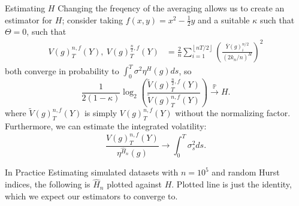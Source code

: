\documentclass[final,hyperref={pdfpagelabels=false}]{beamer}
\begin{document}
\begin{frame}{}
\begin{columns}[t]
      \begin{column}{0.28\linewidth}
        \begin{block}{Estimating \(H\)}
          Changing the freqency of the averaging allows us to create an estimator for \(H\); consider taking \(f(x, y) = x^2 - \frac{1}{2}y\) and a suitable \(\kappa\) such that \(\Theta = 0\), such that 
          \begin{align*}
            V(g)^{n,f}_T(Y), \ V(g)^{\frac{n}{2},f}_T(Y) &= \frac{2}{n}\sum_{i=1}^{\left\lfloor nT/2 \right\rfloor} \left(\frac{\overline{Y}(g)^{n/2}_i}{(2k_n/n)^H}\right)^2
          \end{align*}
          both converge in probability to \( \int_0^T \sigma^2\eta^H(g) ds\), so
          \[
            \frac{1}{2(1 - \kappa)} \log_2\left(\frac{\widetilde{V}(g)^{\frac{n}{2},f}_T(Y)}{\widetilde{V}(g)^{n,f}_T(Y)}\right) \overset{\mathbb{P}}{\rightarrow} H.
          \]
          where \(\widetilde{V}(g)^{n,f}_T(Y)\) is simply \(V(g)^{n,f}_T(Y)\) without the normalizing factor.
          Furthermore, we can estimate the integrated volatility:
          \[
            \frac{V(g)^{n,f}_T(Y)}{\eta^{\hat{H}_n}(g)} \rightarrow \int_0^T\sigma^2_sds.
          \]
        \end{block}
        \begin{block}{In Practice}
          Estimating simulated datasets with \(n = 10^5\) and random Hurst indices, the following is \(\hat{H}_n\) plotted against \(H\). Plotted line is just the identity, which we expect our estimators to converge to.


\end{block}
\end{column}
\end{columns}
\end{frame}
\end{document}
